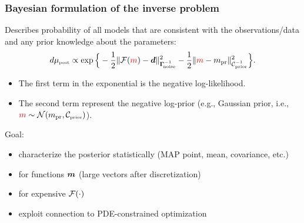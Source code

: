 \documentclass[10pt,final,xcolor=dvipsnames]{beamer}
\begin{document}
\begin{frame}
  \frametitle{Bayesian formulation of the inverse problem}

   Describes probability of all models that are consistent with the
   observations/data and any prior knowledge about the parameters:
    \begin{equation*}
      d\mu_{\mbox{\tiny post}} \propto \exp\Big\{-\frac{1}{2} \| \mathcal{F}(\textcolor{red}{{m}}) -
      \boldsymbol{d} \|^2_{\boldsymbol{\Gamma}_{\!\mbox{\tiny noise}}^{-1}} -\frac{1}{2}\| \textcolor{red}{{m}} - m_{\text{pr}}\|^2_{\mathcal{C}_{\text{\tiny{prior}}}^{-1}} \Big\}.
    \end{equation*}
    \begin{itemize}
    \item The first term in the exponential is the negative log-likelihood.
    \item The second term represent the negative log-prior (e.g.,
      Gaussian prior, i.e., $\textcolor{red}{{m}} \sim \mathcal{N}\!\left( {m_{\text{pr}}}, {\mathcal{C}_{\text{\tiny{prior}}}}\right)$).
    \end{itemize}

    \begin{block}{Goal:}
      \begin{itemize}
      \item characterize the posterior statistically (MAP point, mean, covariance, etc.)
      \item for functions $\boldsymbol{m}$ (large vectors after discretization)
      \item for expensive $\mathcal{F}(\cdot)$
      \item exploit connection to PDE-constrained optimization
      \end{itemize}
    \end{block}
\end{frame}
\end{document}
